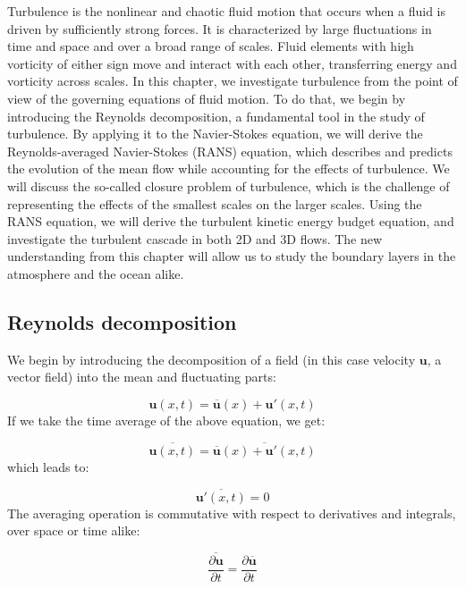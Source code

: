 \documentclass[12pt]{article}
\numberwithin{equation}{section}
\numberwithin{figure}{section}
\numberwithin{table}{section}
\begin{document}
Turbulence is the nonlinear and chaotic fluid motion that occurs when a fluid
is driven by sufficiently strong forces.
It is characterized by large fluctuations in time and space and over a broad
range of scales.
Fluid elements with high vorticity of either sign move and interact with each
other, transferring energy and vorticity across scales.
In this chapter, we investigate turbulence from the point of view of the
governing equations of fluid motion.
To do that, we begin by introducing the Reynolds decomposition, a fundamental
tool in the study of turbulence.
By applying it to the Navier-Stokes equation, we will derive the Reynolds-averaged
Navier-Stokes (RANS) equation, which describes and predicts the evolution of the
mean flow while accounting for the effects of turbulence.
We will discuss the so-called closure problem of turbulence, which is the
challenge of representing the effects of the smallest scales on the larger scales.
Using the RANS equation, we will derive the turbulent kinetic energy budget
equation, and investigate the turbulent cascade in both 2D and 3D flows.
The new understanding from this chapter will allow us to study the boundary
layers in the atmosphere and the ocean alike.

\subsection{Reynolds decomposition}
\label{sec:reynolds_decomposition}

We begin by introducing the decomposition of a field (in this case velocity
$\mathbf{u}$, a vector field) into the mean and fluctuating parts:

\begin{equation}
  \mathbf{u}(x, t) = \overline{\mathbf{u}}(x) + \mathbf{u}'(x, t)
\end{equation}
If we take the time average of the above equation, we get:

\begin{equation}
  \overline{\mathbf{u}(x, t)} = \overline{\overline{\mathbf{u}}(x) + \mathbf{u}'(x, t)}
\end{equation}
which leads to:

\begin{equation}
  \overline{\mathbf{u}'(x, t)} = 0
\end{equation}
The averaging operation is commutative with respect to derivatives and integrals,
over space or time alike:

\begin{equation}
  \overline{\frac{\partial \mathbf{u}}{\partial t}} = \frac{\partial \overline{\mathbf{u}}}{\partial t}
\end{equation}
\end{document}
